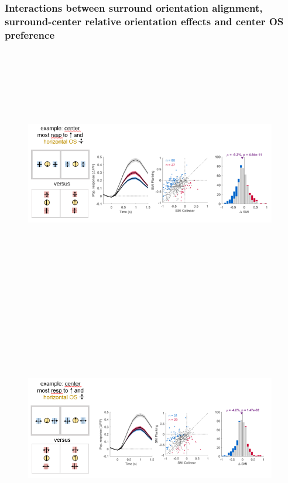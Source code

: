 \subsubsection{Interactions between surround orientation alignment, surround-center relative orientation effects and center OS preference}

\begin{figure}[H] \centering \includegraphics[width=11cm,height=11cm,keepaspectratio]{Figures/7.Results/finalPopulation/sel/diagrams/13.png} 
\end{figure}

\begin{figure}[H] \centering \includegraphics[width=11cm,height=11cm,keepaspectratio]{Figures/7.Results/finalPopulation/sel/diagrams/14.png} 
\end{figure}

